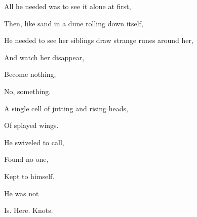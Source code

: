\documentclass[11pt]{article}
\begin{document}
\begingroup
\begin{center}
All he needed was to see it alone at first,
\end{center}
\endgroup

\begingroup
\begin{center}
Then, like sand in a dune rolling down itself,
\end{center}
\endgroup

\begingroup
\begin{center}
He needed to see her siblings draw strange runes around her,
\end{center}
\endgroup

\begingroup
\begin{center}
And watch her disappear,
\end{center}
\endgroup

\begingroup
\begin{center}
Become nothing,
\end{center}
\endgroup

\begingroup
\begin{center}
No, something.
\end{center}
\endgroup

\begingroup
\begin{center}
A single cell of jutting and rising heads,
\end{center}
\endgroup

\begingroup
\begin{center}
Of splayed wings.
\end{center}
\endgroup

\begingroup
\begin{center}
He swiveled to call,
\end{center}
\endgroup

\begingroup
\begin{center}
Found no one,
\end{center}
\endgroup

\begingroup
\begin{center}
Kept to himself.
\end{center}
\endgroup

\begingroup
\begin{center}
He was not
\end{center}
\endgroup

\vspace*{4\baselineskip}

\begingroup
\begin{center}
Is. Here. Knots.
\rightskip\leftskip
\end{center}
\endgroup
\end{document}
